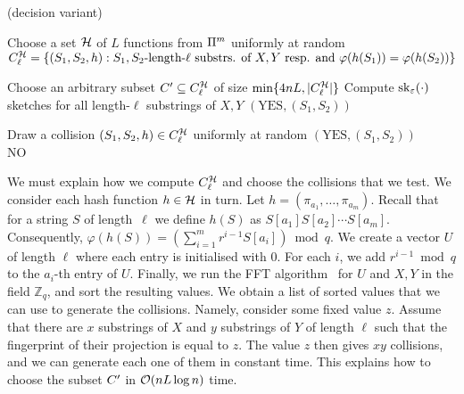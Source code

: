 \begin{algorithm}[ht]
\caption{\kApproxLCS (decision variant)}
\begin{algorithmic}[1]
\State Choose a set $\mathcal{H}$ of $L$ functions from $\Pi^m$ uniformly at random
\State $C^{\mathcal{H}}_{\ell}=\{(S_1,S_2, h):S_1, S_2\text{-length-$\ell$ substrs. of $X,Y$ resp. and }\varphi(h(S_1)) = \varphi(h(S_2))\}$\label{ln:hashes}

\State Choose an arbitrary subset $C' \subseteq C^{\mathcal{H}}_{\ell}$ of size $\min\{4nL,|C^{\mathcal{H}}_{\ell}|\}$
\State Compute $\mathrm{sk}_\varepsilon(\cdot)$ sketches for all length-$\ell$ substrings of $X, Y$  \label{ln:sketches}
 \label{ln:test1}
	 \label{ln:Hamming_dist}\Return $(\text{YES},(S_1,S_2))$
	\EndIf
\EndFor

\State Draw a collision $(S_1, S_2, h) \in C^{\mathcal{H}}_{\ell}$ uniformly at random \label{ln:test2}
 \label{ln:test3}\Return $(\text{YES},(S_1,S_2))$
\EndIf\\
\Return NO
\end{algorithmic}
\label{alg:LSH}
\end{algorithm}

We must explain how we compute $C^{\mathcal{H}}_{\ell}$ and choose the collisions that we test. We consider each hash function $h \in \mathcal{H}$ in turn. Let $h = (\pi_{a_1},\ldots,\pi_{a_m})$. Recall that for a string $S$ of length~$\ell$ we define $h(S)$ as $S[a_{1}] S[a_{2}] \cdots S[a_{m}]$. Consequently, $\varphi(h(S)) =  (\sum_{i=1}^m r^{i-1} S[a_{i}]) \bmod q$. We create a vector $U$ of length $\ell$ where each entry is initialised with $0$. For each $i$, we add $r^{i-1} \bmod q$ to the $a_{i}$-th entry of $U$. Finally, we run the FFT algorithm~\cite{FischerPaterson} for $U$ and $X, Y$ in the field $\mathbb{Z}_q$, and sort the resulting values. We obtain a list of sorted values that we can use to generate the collisions. Namely, consider some fixed value $z$. Assume that there are $x$ substrings of $X$ and $y$ substrings of $Y$ of length $\ell$ such that the fingerprint of their projection is equal to $z$. The value $z$ then gives $xy$ collisions, and we can generate each one of them in constant time. This explains how to choose the subset $C'$ in $\mathcal{O}(nL \log n)$ time.

